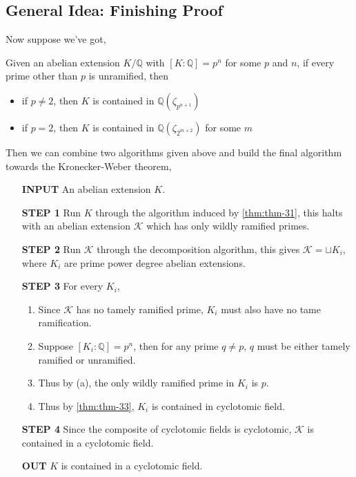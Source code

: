 \subsection{General Idea: Finishing Proof}
Now suppose we've got,
\begin{thm}
\label{thm:thm-33}
Given an abelian extension $K/\mathbb{Q}$ with $[K : \mathbb{Q}]=p^n$ for some $p$ and $n$, if every prime other than $p$ is unramified, then
\begin{itemize}
\item if $p \neq 2$, then $K$ is contained in $\mathbb{Q}({\zeta_{p^{n+1}}})$
\item if $p=2$, then $K$ is contained in $\mathbb{Q}(\zeta_{2^{m+2}})$ for some $m$
\end{itemize}
\end{thm}
\noindent
Then we can combine two algorithms given above and build the final algorithm towards the Kronecker-Weber theorem,
\begin{importantbox}
\begin{enumerate}
\item[\textbf{INPUT}] An abelian extension $K$.
\item[\textbf{STEP 1}] Run $K$ through the algorithm induced by \autoref{thm:thm-31}, this halts with an abelian extension $\mathscr{K}$ which has only wildly ramified primes.
\item[\textbf{STEP 2}] Run $\mathscr{K}$ through the decomposition algorithm, this gives $\mathscr{K} = \sqcup K_i$, where $K_i$ are prime power degree abelian extensions.
\item[\textbf{STEP 3}] For every $K_i$,
\begin{enumerate}
\item Since $\mathscr{K}$ has no tamely ramified prime, $K_i$ must also have no tame ramification.
\item Suppose $[K_i : \mathbb{Q}]=p^n$, then for any prime $q \neq p$, $q$ must be either tamely ramified or unramified. 
\item Thus by (a), the only wildly ramified prime in $K_i$ is $p$.
\item Thus by \autoref{thm:thm-33}, $K_i$ is contained in cyclotomic field.
\end{enumerate}
\item[\textbf{STEP 4}] Since the composite of cyclotomic fields is cyclotomic, $\mathscr{K}$ is contained in a cyclotomic field.
\item[\textbf{OUT}] $K$ is contained in a cyclotomic field.
\end{enumerate}
\end{importantbox}
\newpage
